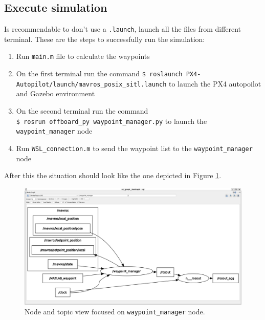 \subsection{Execute simulation}
Is recommendable to don't use a \texttt{.launch}, launch all the files from different terminal. These are the steps to successfully run the simulation:
\begin{enumerate}
	\item Run \texttt{main.m} file to calculate the waypoints
	\item On the first terminal run the command \texttt{\$ roslaunch PX4-Autopilot/launch/mavros\_posix\_sitl.launch} to launch the PX4 autopoilot and Gazebo environment
	\item On the second terminal run the command \\
	\texttt{\$ rosrun offboard\_py waypoint\_manager.py} to launch the \texttt{waypoint\_manager} node
	\item Run \texttt{WSL\_connection.m} to send the waypoint list to the \texttt{waypoint\_manager} node
\end{enumerate}
After this the situation should look like the one depicted in Figure \ref{fig:rqt_graph_view}.
\begin{figure}[hbt!]
	\centering
	\includegraphics[width=\linewidth]{"images/rqt_graph view"}
	\caption{Node and topic view focused on \texttt{waypoint\_manager} node.}
	\label{fig:rqt_graph_view}
\end{figure}
